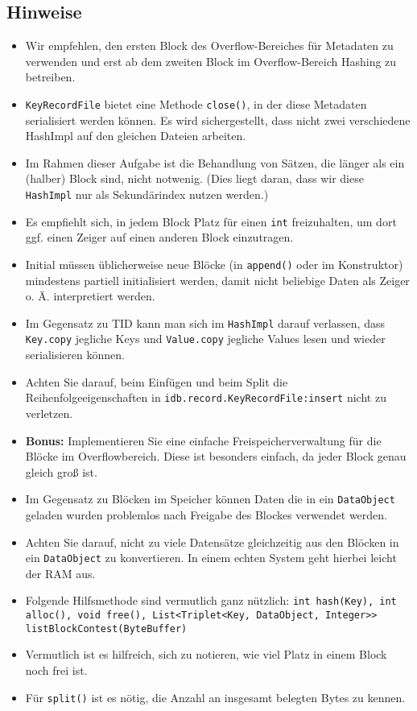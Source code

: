 \subsection{Hinweise}
\begin{itemize}
	\item Wir empfehlen, den ersten Block des Overflow-Bereiches für Metadaten zu verwenden und erst ab dem zweiten Block im Overflow-Bereich Hashing zu betreiben.
	\item \texttt{KeyRecordFile} bietet eine Methode \texttt{close()}, in der diese Metadaten serialisiert werden können.
		Es wird sichergestellt, dass nicht zwei verschiedene \mbox{HashImpl} auf den gleichen Dateien arbeiten.
	\item Im Rahmen dieser Aufgabe ist die Behandlung von Sätzen, die länger als ein (halber) Block sind, nicht notwenig. (Dies liegt daran, dass wir diese \texttt{HashImpl} nur als Sekundärindex nutzen werden.)
	\item Es empfiehlt sich, in jedem Block Platz für einen \texttt{int} freizuhalten, um dort ggf. einen Zeiger auf einen anderen Block einzutragen.
	\item Initial müssen üblicherweise neue Blöcke (in \texttt{append()} oder im Konstruktor) mindestens partiell initialisiert werden, damit nicht beliebige Daten als Zeiger o. Ä. interpretiert werden.
	\item Im Gegensatz zu TID kann man sich im \texttt{HashImpl} darauf verlassen, dass \texttt{Key.copy} jegliche Keys und \texttt{Value.copy} jegliche Values lesen und wieder serialisieren können.
	\item Achten Sie darauf, beim Einfügen und beim Split die Reihenfolgeeigenschaften in \texttt{idb.record.KeyRecordFile:insert} nicht zu verletzen.
	\item \textbf{Bonus:} Implementieren Sie eine einfache Freispeicherverwaltung für die Blöcke im Overflowbereich. Diese ist besonders einfach, da jeder Block genau gleich groß ist.
	\item Im Gegensatz zu Blöcken im Speicher können Daten die in ein \texttt{DataObject} geladen wurden problemlos nach Freigabe des Blockes verwendet werden.
	\item Achten Sie darauf, nicht zu viele Datensätze gleichzeitig aus den Blöcken in ein \texttt{DataObject} zu konvertieren. In einem echten System geht hierbei leicht der RAM aus.
	\item Folgende Hilfsmethode sind vermutlich ganz nützlich: \texttt{int hash(Key), int alloc(), void free(), List<Triplet<Key, DataObject, Integer>> listBlockContest(ByteBuffer)}
	\item Vermutlich ist es hilfreich, sich zu notieren, wie viel Platz in einem Block noch frei ist.
	\item Für \texttt{split()} ist es nötig, die Anzahl an insgesamt belegten Bytes zu kennen.
\end{itemize}
